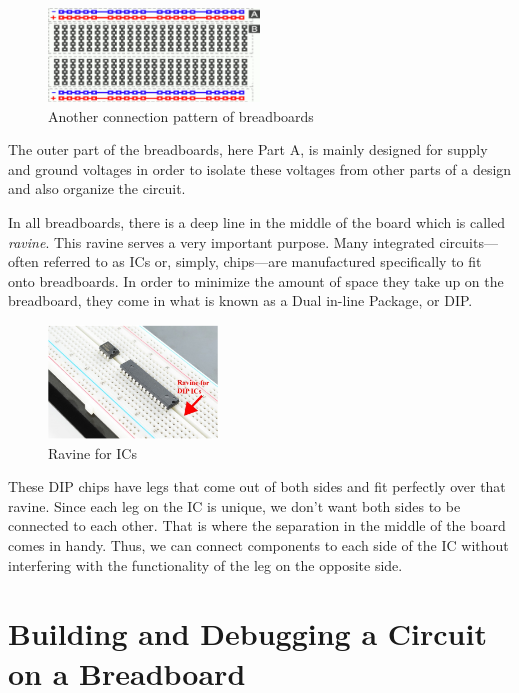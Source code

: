 \documentclass[12pt, logo=tehranDLDL/ut]{tehranDLDL}
\begin{document}
\begin{figure}
    \centering
    \caption{Another connection pattern of breadboards\label{fig:connected-breadboard}}
    \includegraphics[width=0.5\textwidth]{breadboard.png}
\end{figure}

The outer part of the breadboards, here Part A, is mainly designed for supply and ground voltages in order to isolate these voltages from other parts of a design and also organize the circuit.

In all breadboards, there is a deep line in the middle of the board which is called \textit{ravine}. This ravine serves a very important purpose. Many integrated circuits---often referred to as ICs or, simply, chips---are manufactured specifically to fit onto breadboards. In order to minimize the amount of space they take up on the breadboard, they come in what is known as a Dual in-line Package, or DIP.

\begin{figure}
    \centering
    \caption{Ravine for ICs\label{fig:ravine}}
    \includegraphics[width=0.4\textwidth]{ravine.png}
\end{figure}

These DIP chips have legs that come out of both sides and fit perfectly over that ravine. Since each leg on the IC is unique, we don't want both sides to be connected to each other. That is where the separation in the middle of the board comes in handy. Thus, we can connect components to each side of the IC without interfering with the functionality of the leg on the opposite side.

\section{Building and Debugging a Circuit on a Breadboard}
\end{document}
